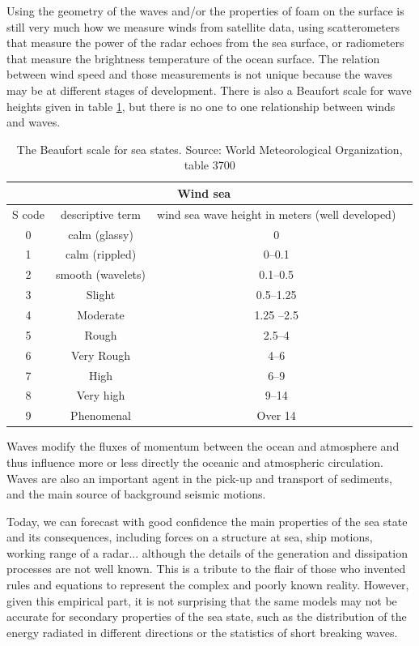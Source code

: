  Using the geometry of the waves and/or the properties of foam on the surface is still very much how we measure winds from satellite data, using scatterometers that measure the power of the radar echoes from the sea surface, or radiometers that measure the brightness temperature of the ocean surface. The relation between wind speed and those measurements
  is not unique because the waves may be at different stages of development. There is also a Beaufort scale for wave heights given in table \ref{table_seastate}, but there is no one to one relationship between winds and waves. 


\begin{table}[htb]
  \centering
  \begin{tabular}{|c|c|c|c|}
\hline
    \multicolumn{3}{|c|}{Wind sea} \\
 \hline
S code & descriptive term & wind sea wave height in meters (well developed)  \\
0 & calm (glassy)         & 0 \\
1 & calm (rippled)        & 0--0.1\\
2 & smooth (wavelets)     & 0.1--0.5 \\
3 & Slight                & 0.5--1.25  \\
4 & Moderate              & 1.25 --2.5  \\
5 & Rough                 & 2.5--4 \\
6 & Very Rough            & 4--6  \\
7 & High                  & 6--9 \\
8 & Very high             & 9--14  \\
9 & Phenomenal            & Over 14  \\
\hline
\end{tabular}
\caption{The Beaufort scale for sea states. Source: World Meteorological Organization, table 3700 \label{table_beaufort}}
\label{table_seastate}
\end{table}


Waves modify the fluxes of momentum between the ocean and atmosphere and thus influence more or less directly the oceanic and 
atmospheric circulation. Waves are also an important agent in the pick-up and transport of sediments, and 
the main source of background seismic motions. 


Today, we can forecast with good confidence the main properties of the sea state and its consequences, including forces on a structure 
at sea, ship motions, working range of a radar... although the details of the generation and dissipation processes are not well known. 
This is a tribute to the flair of those who invented rules and equations to represent the complex and poorly known reality. 
However, given this empirical part, it is not surprising that the same models may not be accurate for secondary properties of the sea state, such as the distribution 
of the energy radiated in different directions or the statistics of short breaking waves. 


